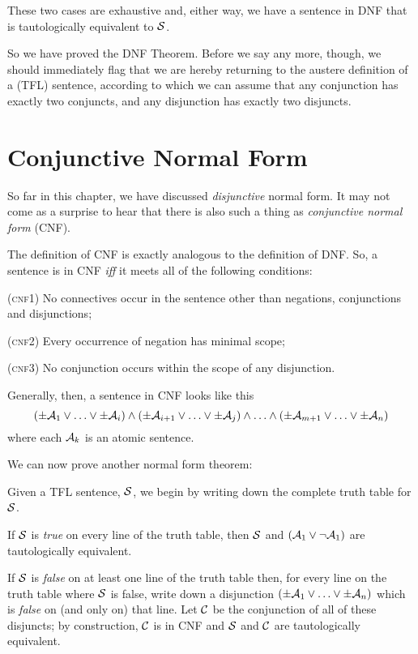 	These two cases are exhaustive and, either way, we have a sentence in DNF that is tautologically equivalent to $\mathcal{S}$.

So we have proved the DNF Theorem. Before we say any more, though, we should immediately flag that we are hereby returning to the austere definition of a (TFL) sentence, according to which we can assume that any conjunction has exactly two conjuncts, and any disjunction has exactly two disjuncts.


\section{Conjunctive Normal Form}
\label{s:CNF}

So far in this chapter, we have discussed \emph{disjunctive} normal form. It may not come as a surprise to hear that there is also such a thing as \emph{conjunctive normal form} (CNF).

The definition of CNF is exactly analogous to the definition of DNF. So, a sentence is in CNF \emph{iff} it meets all of the following conditions:
	\begin{earg}
		\item[(\textsc{cnf1})] No connectives occur in the sentence other than negations, conjunctions and disjunctions;
		\item[(\textsc{cnf2})] Every occurrence of negation has minimal scope;
		\item[(\textsc{cnf3})] No conjunction occurs within the scope of any disjunction. 
	\end{earg}
Generally, then, a sentence in CNF looks like this
	$$(\pm \mathcal{A}_1 \lor \ldots \lor \pm \mathcal{A}_i) \land (\pm \mathcal{A}_{i+1} \lor \ldots \lor \pm\mathcal{A}_j) \land \ldots \land (\pm\mathcal{A}_{m+1} \lor\ldots \lor \pm \mathcal{A}_n)$$
where each $\mathcal{A}_k$ is an atomic sentence.

We can now prove another normal form theorem:

        
	Given a TFL sentence, $\mathcal{S}$, we begin by writing down the complete truth table for $\mathcal{S}$.
	
	If $\mathcal{S}$ is \emph{true} on every line of the truth table, then $\mathcal{S}$ and $(\mathcal{A}_1 \vee \neg \mathcal{A}_1)$ are tautologically equivalent.
	
	If $\mathcal{S}$ is \emph{false} on at least one line of the truth table then, for every line on the truth table where $\mathcal{S}$ is false, write down a disjunction $(\pm\mathcal{A}_1 \vee \ldots \vee \pm\mathcal{A}_n)$ which is \emph{false} on (and only on) that line. Let $\mathcal{C}$ be the conjunction of all of these disjuncts; by construction, $\mathcal{C}$ is in CNF and $\mathcal{S}$ and $\mathcal{C}$ are tautologically equivalent.

